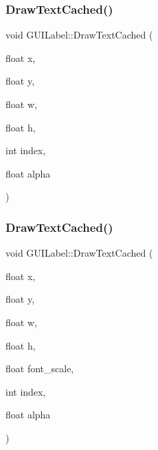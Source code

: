 \hypertarget{class_g_u_i_label_aa0ea22ea58afca04574f83f42e3922c5}{}\label{class_g_u_i_label_aa0ea22ea58afca04574f83f42e3922c5} 
\subsubsection{\texorpdfstring{Draw\+Text\+Cached()}{DrawTextCached()}\hspace{0.1cm}{\footnotesize\ttfamily [2/3]}}
{\footnotesize\ttfamily void G\+U\+I\+Label\+::\+Draw\+Text\+Cached (\begin{DoxyParamCaption}\item[{float}]{x,  }\item[{float}]{y,  }\item[{float}]{w,  }\item[{float}]{h,  }\item[{int}]{index,  }\item[{float}]{alpha }\end{DoxyParamCaption})}

\hypertarget{class_g_u_i_label_a17cec9620d45ce98ae2020684b6d18b1}{}\label{class_g_u_i_label_a17cec9620d45ce98ae2020684b6d18b1} 
\subsubsection{\texorpdfstring{Draw\+Text\+Cached()}{DrawTextCached()}\hspace{0.1cm}{\footnotesize\ttfamily [3/3]}}
{\footnotesize\ttfamily void G\+U\+I\+Label\+::\+Draw\+Text\+Cached (\begin{DoxyParamCaption}\item[{float}]{x,  }\item[{float}]{y,  }\item[{float}]{w,  }\item[{float}]{h,  }\item[{float}]{font\+\_\+scale,  }\item[{int}]{index,  }\item[{float}]{alpha }\end{DoxyParamCaption})}

\hypertarget{class_g_u_i_label_a76e2bc539833f4f9bee774788d9da581}{}\label{class_g_u_i_label_a76e2bc539833f4f9bee774788d9da581} 
